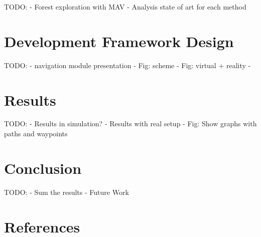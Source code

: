 \documentclass[runningheads]{llncs}
\begin{document}
TODO:
- Forest exploration with MAV
- Analysis state of art for each method


\section{Development Framework Design}

TODO:
- navigation module presentation
- Fig: scheme
- Fig: virtual + reality
- 

\section{Results}

TODO:
- Results in simulation?
- Results with real setup
- Fig: Show graphs with paths and waypoints

\section{Conclusion}

TODO:
- Sum the results
- Future Work

\section{References}
\end{document}
